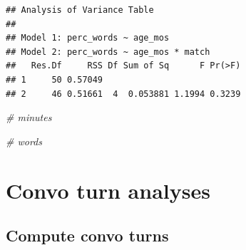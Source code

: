 \documentclass[
]{article}
\newenvironment{Shaded}{\begin{snugshade}}{\end{snugshade}}
\newcommand{\CommentTok}[1]{\textcolor[rgb]{0.56,0.35,0.01}{\textit{#1}}}
\begin{document}
\begin{verbatim}
## Analysis of Variance Table
## 
## Model 1: perc_words ~ age_mos
## Model 2: perc_words ~ age_mos * match
##   Res.Df     RSS Df Sum of Sq      F Pr(>F)
## 1     50 0.57049                           
## 2     46 0.51661  4  0.053881 1.1994 0.3239
\end{verbatim}

\begin{Shaded}
\begin{Highlighting}[]
\CommentTok{\# minutes}

\CommentTok{\# words}
\end{Highlighting}
\end{Shaded}

\hypertarget{convo-turn-analyses}{%
\section{Convo turn analyses}\label{convo-turn-analyses}}

\hypertarget{compute-convo-turns}{%
\subsection{Compute convo turns}\label{compute-convo-turns}}
\end{document}
